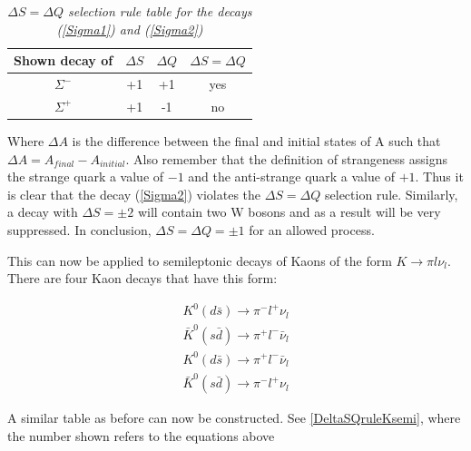 \begin{table}[h!]
\caption{\textit{$\Delta S = \Delta Q$ selection rule table for the decays (\ref{Sigma1}) and (\ref{Sigma2})}}
\centering
\setlength{\tabcolsep}{10pt}
\begin{tabular}{c| ccc}
\hline
Shown decay of   & $\Delta S$ & $\Delta Q$ & $\Delta S = \Delta Q$ \\ 
\hline \hline
$\Sigma^{-}$     &      +1    &    +1      & yes                   \\
$\Sigma^{+}$     &      +1    &    -1      & no                   \\
\hline
\end{tabular} 
\label{DeltaSQruleTable}
\end{table}

\smallskip

\noindent Where $\Delta A$ is the difference between the final and initial states of A such that $\Delta A = A_{final} - A_{initial}$. Also remember that the definition of strangeness assigns the strange quark a value of $-1$ and the anti-strange quark a value of $+1$. Thus it is clear that the decay (\ref{Sigma2}) violates the $\Delta S = \Delta Q$ selection rule. Similarly, a decay with $\Delta S = \pm 2$ will contain two W bosons and as a result will be very suppressed. In conclusion, $\Delta S = \Delta Q = \pm 1$ for an allowed process.      

This can now be applied to semileptonic decays of Kaons of the form $K \rightarrow \pi l \nu_{l}$. There are four Kaon decays that have this form:

\begin{align} %
\label{Ksemi1}
K^{0} (d \bar{s}) \rightarrow \pi^{-} l^{+} \nu_{l} \\
\label{Ksemi2}
\bar{K}^{0} (s \bar{d}) \rightarrow \pi^{+} l^{-} \bar{\nu}_{l} \\
\label{Ksemi3}
K^{0} (d \bar{s}) \rightarrow \pi^{+} l^{-} \bar{\nu}_{l} \\
\label{Ksemi4}
\bar{K}^{0} (s \bar{d}) \rightarrow \pi^{-} l^{+} \nu_{l} 
\end{align} 

\smallskip

\noindent A similar table as before can now be constructed. See \cref{DeltaSQruleKsemi}, where the number shown refers to the equations above

